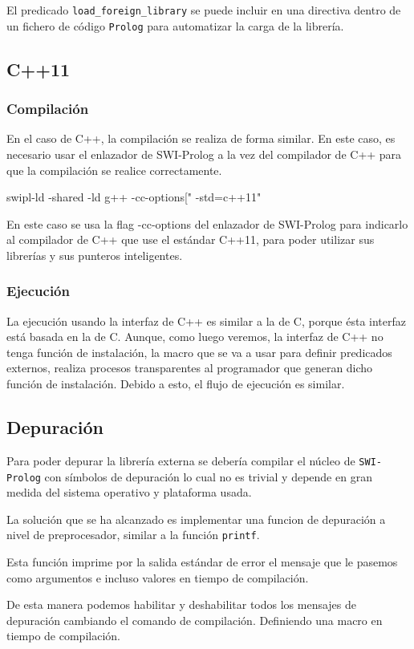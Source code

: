 \documentclass[a4paper]{article}
\begin{document}
El predicado \texttt{load\_foreign\_library} se puede incluir en una directiva dentro de un fichero de código \texttt{Prolog} para automatizar la carga de la librería.

\subsection{C++11}
\subsubsection{Compilación}
En el caso de C++, la compilación se realiza de forma similar. En este caso, es necesario usar el enlazador de SWI-Prolog a la vez del compilador de C++ para que la compilación se realice correctamente.

swipl-ld -shared -ld g++ -cc-options[" -std=c++11"

En este caso se usa la flag -cc-options del enlazador de SWI-Prolog para indicarlo al compilador de C++ que use el estándar C++11, para poder utilizar sus librerías y sus punteros inteligentes.
\subsubsection{Ejecución}
La ejecución usando la interfaz de C++ es similar a la de C, porque ésta interfaz está basada en la de C. Aunque, como luego veremos, la interfaz de C++ no tenga función de instalación, la macro que se va a usar para definir predicados externos, realiza procesos transparentes al programador que generan dicho función de instalación. Debido a esto, el flujo de ejecución es similar.

\subsection{Depuración}
Para poder depurar la librería externa se debería compilar el núcleo de \texttt{SWI-Prolog} con símbolos de depuración lo cual no es trivial y depende en gran medida del sistema operativo y plataforma usada.

La solución que se ha alcanzado es implementar una funcion de depuración a nivel de preprocesador, similar a la función \texttt{printf}.

Esta función imprime por la salida estándar de error el mensaje que le pasemos como argumentos e incluso valores en tiempo de compilación.

De esta manera podemos habilitar y deshabilitar todos los mensajes de depuración cambiando el comando de compilación. Definiendo una macro en tiempo de compilación.
\end{document}
